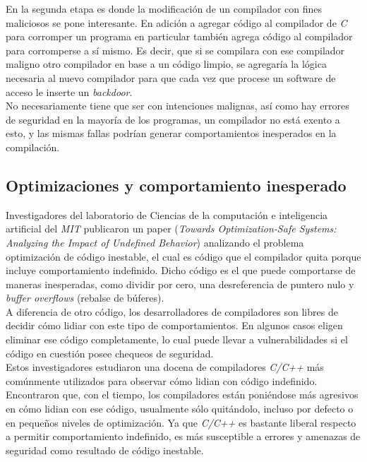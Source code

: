 En la segunda etapa es donde la modificación de un compilador con fines maliciosos se pone interesante. En adición a agregar código al compilador de \textit{C} para corromper un programa en particular también agrega código al compilador para corromperse a sí mismo. Es decir, que si se compilara con ese compilador maligno otro compilador en base a un código limpio, se agregaría la lógica necesaria al nuevo compilador para que cada vez que procese un software de acceso le inserte un \textit{backdoor}.\\

No necesariamente tiene que ser con intenciones malignas, así como hay errores de seguridad en la mayoría de los programas, un compilador no está exento a esto, y las mismas fallas podrían generar comportamientos inesperados en la compilación.


\subsection{Optimizaciones y comportamiento inesperado}
Investigadores del laboratorio de Ciencias de la computación e inteligencia artificial del \textit{MIT} publicaron un paper (\textit{Towards Optimization-Safe Systems: Analyzing the Impact of Undefined Behavior}) analizando el problema optimización de código inestable, el cual es código que el compilador quita porque incluye comportamiento indefinido. Dicho código es el que puede comportarse de maneras inesperadas, como dividir por cero, una desreferencia de puntero nulo y \textit{buffer overflows} (rebalse de búferes).\\

A diferencia de otro código, los desarrolladores de compiladores son libres de decidir cómo lidiar con este tipo de comportamientos. En algunos casos eligen eliminar ese código completamente, lo cual puede llevar a vulnerabilidades si el código en cuestión posee chequeos de seguridad.\\

Estos investigadores estudiaron una docena de compiladores \textit{C/C++} más comúnmente utilizados para observar cómo lidian con código indefinido. Encontraron que, con el tiempo, los compiladores están poniéndose más agresivos en cómo lidian con ese código, usualmente sólo quitándolo, incluso por defecto o en pequeños niveles de optimización. Ya que \textit{C/C++} es bastante liberal respecto a permitir comportamiento indefinido, es más susceptible a errores y amenazas de seguridad como resultado de código inestable.\\

